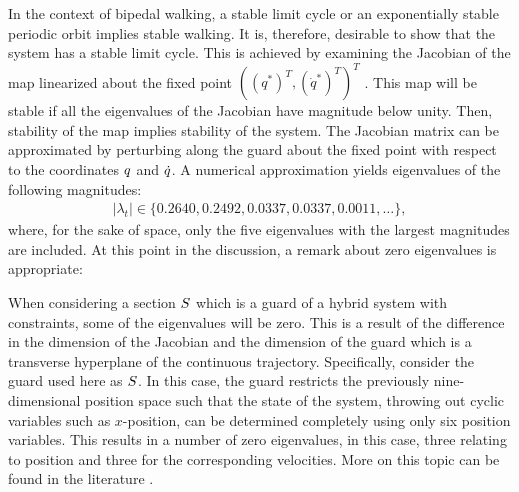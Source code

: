 In the context of bipedal walking, a stable limit cycle or an exponentially
stable periodic orbit implies stable walking.
%
It is, therefore, desirable to show that the system has a stable limit cycle.
%
This is achieved by examining the Jacobian of the \Poincare{} map linearized
about the fixed point $((q^*)^T, ({\dot q}^*)^T)^T$ \cite{Parker1989}.
%
This \Poincare{} map will be stable if all the eigenvalues of the Jacobian have
magnitude below unity.
%
Then, stability of the \Poincare{} map implies stability of the system.
%
The Jacobian matrix can be approximated by perturbing along the guard about the
fixed point with respect to the coordinates $q$ and $\dot{q}$.
%
A numerical approximation yields eigenvalues of the following magnitudes:
%
\begin{align}
  \label{eq:time-eigs}
  |\lambda_t| \in \{0.2640, 0.2492, 0.0337, 0.0337, 0.0011, \ldots\},
\end{align}
where, for the sake of space, only the five eigenvalues with the largest
magnitudes are included.
%
At this point in the discussion, a remark about zero eigenvalues is appropriate:

\begin{remark}
  When considering a \Poincare{} section $S$ which is a guard of a hybrid
  system with constraints, some of the eigenvalues will be zero.
  This is a result of the difference in the dimension of the Jacobian and the
  dimension of the guard which is a transverse hyperplane of the continuous
  trajectory.
  Specifically, consider the guard used here as $S$.
  In this  case, the guard restricts the previously nine-dimensional position
  space such that the state of the system, throwing out cyclic variables such as
  $x$-position, can be determined completely using only six position variables.
  This results in a number of zero eigenvalues, in this case, three relating to
  position and three for the corresponding velocities.
  More on this topic can be found in the literature \cite{Wendel2010}.
\end{remark}

